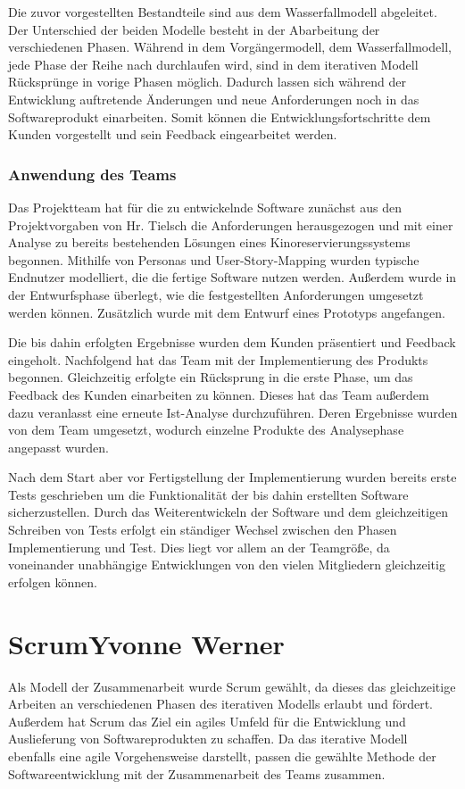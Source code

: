 Die zuvor vorgestellten Bestandteile sind aus dem Wasserfallmodell abgeleitet. Der Unterschied der beiden Modelle besteht in der Abarbeitung der verschiedenen Phasen. Während in dem Vorgängermodell, dem Wasserfallmodell, jede Phase der Reihe nach durchlaufen wird, sind in dem iterativen Modell Rücksprünge in vorige Phasen möglich. Dadurch lassen sich während der Entwicklung auftretende Änderungen und neue Anforderungen noch in das Softwareprodukt einarbeiten. Somit können die Entwicklungsfortschritte dem Kunden vorgestellt und sein Feedback eingearbeitet werden. 

\subsubsection{Anwendung des Teams}
Das Projektteam hat für die zu entwickelnde Software zunächst aus den Projektvorgaben von Hr. Tielsch die Anforderungen herausgezogen und mit einer Analyse zu bereits bestehenden Lösungen eines Kinoreservierungssystems begonnen. Mithilfe von Personas und User-Story-Mapping wurden typische Endnutzer modelliert, die die fertige Software nutzen werden. Außerdem wurde in der Entwurfsphase überlegt, wie die festgestellten Anforderungen umgesetzt werden können. Zusätzlich wurde mit dem Entwurf eines Prototyps angefangen. 

Die bis dahin erfolgten Ergebnisse wurden dem Kunden präsentiert und Feedback eingeholt. Nachfolgend hat das Team mit der Implementierung des Produkts begonnen. Gleichzeitig erfolgte ein Rücksprung in die erste Phase, um das Feedback des Kunden einarbeiten zu können. Dieses hat das Team außerdem dazu veranlasst eine erneute Ist-Analyse durchzuführen. Deren Ergebnisse wurden von dem Team umgesetzt, wodurch einzelne Produkte des Analysephase angepasst wurden. 

Nach dem Start aber vor Fertigstellung der Implementierung wurden bereits erste Tests geschrieben um die Funktionalität der bis dahin erstellten Software sicherzustellen. Durch das Weiterentwickeln der Software und dem gleichzeitigen Schreiben von Tests erfolgt ein ständiger Wechsel zwischen den Phasen Implementierung und Test. Dies liegt vor allem an der Teamgröße, da voneinander unabhängige Entwicklungen von den vielen Mitgliedern gleichzeitig erfolgen können. 
 
\section[Scrum]{Scrum{\hfill \normalsize Yvonne Werner}} \label{chapter:SCRUM}
Als Modell der Zusammenarbeit wurde Scrum gewählt, da dieses das gleichzeitige Arbeiten an verschiedenen Phasen des iterativen Modells erlaubt und fördert. Außerdem hat Scrum das Ziel ein agiles Umfeld für die Entwicklung und Auslieferung von Softwareprodukten zu schaffen. Da das iterative Modell ebenfalls eine agile Vorgehensweise darstellt, passen die gewählte Methode der Softwareentwicklung mit der Zusammenarbeit des Teams zusammen. 

